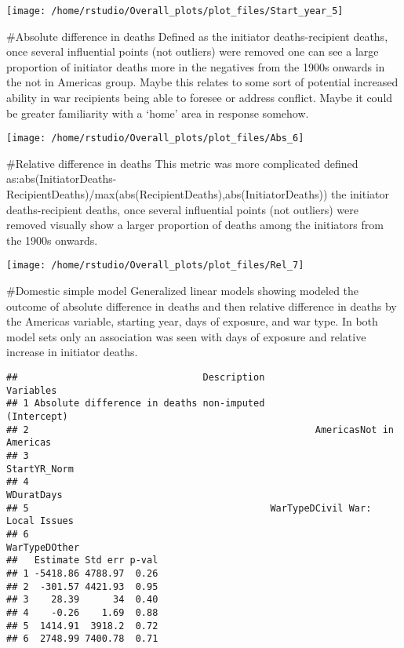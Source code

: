 \documentclass[
]{article}
\begin{document}
\texttt{[image: /home/rstudio/Overall\_plots/plot\_files/Start\_year\_5]}

\#Absolute difference in deaths Defined as the initiator
deaths-recipient deaths, once several influential points (not outliers)
were removed one can see a large proportion of initiator deaths more in
the negatives from the 1900s onwards in the not in Americas group. Maybe
this relates to some sort of potential increased ability in war
recipients being able to foresee or address conflict. Maybe it could be
greater familiarity with a `home' area in response somehow.

\texttt{[image: /home/rstudio/Overall\_plots/plot\_files/Abs\_6]}

\#Relative difference in deaths This metric was more complicated defined
as:abs(InitiatorDeaths-RecipientDeaths)/max(abs(RecipientDeaths),abs(InitiatorDeaths))
the initiator deaths-recipient deaths, once several influential points
(not outliers) were removed visually show a larger proportion of deaths
among the initiators from the 1900s onwards.

\texttt{[image: /home/rstudio/Overall\_plots/plot\_files/Rel\_7]}

\#Domestic simple model Generalized linear models showing modeled the
outcome of absolute difference in deaths and then relative difference in
deaths by the Americas variable, starting year, days of exposure, and
war type. In both model sets only an association was seen with days of
exposure and relative increase in initiator deaths.

\begin{verbatim}
##                                 Description                       Variables
## 1 Absolute difference in deaths non-imputed                     (Intercept)
## 2                                                   AmericasNot in Americas
## 3                                                              StartYR_Norm
## 4                                                                WDuratDays
## 5                                           WarTypeDCivil War: Local Issues
## 6                                                             WarTypeDOther
##   Estimate Std err p-val
## 1 -5418.86 4788.97  0.26
## 2  -301.57 4421.93  0.95
## 3    28.39      34  0.40
## 4    -0.26    1.69  0.88
## 5  1414.91  3918.2  0.72
## 6  2748.99 7400.78  0.71
\end{verbatim}
\end{document}
